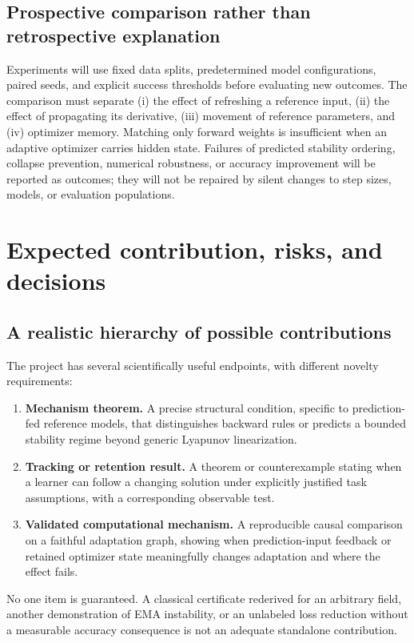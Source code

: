\documentclass[11pt,a4paper]{article}
\begin{document}
\subsection{Prospective comparison rather than retrospective explanation}
Experiments will use fixed data splits, predetermined model configurations, paired seeds, and explicit success thresholds before evaluating new outcomes. The comparison must separate (i) the effect of refreshing a reference input, (ii) the effect of propagating its derivative, (iii) movement of reference parameters, and (iv) optimizer memory. Matching only forward weights is insufficient when an adaptive optimizer carries hidden state. Failures of predicted stability ordering, collapse prevention, numerical robustness, or accuracy improvement will be reported as outcomes; they will not be repaired by silent changes to step sizes, models, or evaluation populations.

\section{Expected contribution, risks, and decisions}

\subsection{A realistic hierarchy of possible contributions}
The project has several scientifically useful endpoints, with different novelty requirements:
\begin{enumerate}
\item \textbf{Mechanism theorem.} A precise structural condition, specific to prediction-fed reference models, that distinguishes backward rules or predicts a bounded stability regime beyond generic Lyapunov linearization.
\item \textbf{Tracking or retention result.} A theorem or counterexample stating when a learner can follow a changing solution under explicitly justified task assumptions, with a corresponding observable test.
\item \textbf{Validated computational mechanism.} A reproducible causal comparison on a faithful adaptation graph, showing when prediction-input feedback or retained optimizer state meaningfully changes adaptation and where the effect fails.
\end{enumerate}
No one item is guaranteed. A classical certificate rederived for an arbitrary field, another demonstration of EMA instability, or an unlabeled loss reduction without a measurable accuracy consequence is not an adequate standalone contribution.
\end{document}
